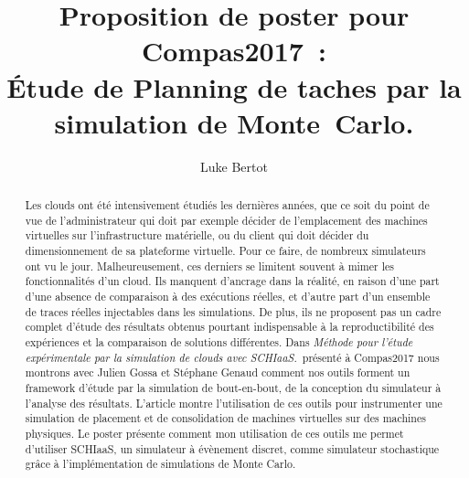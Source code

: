 \documentclass[parallelisme]{../compas2017}
\title{Proposition de poster pour Compas2017~:\\
Étude de Planning de taches par la simulation de Monte~Carlo.}
\author{Luke Bertot}
\begin{document}
\maketitle


%

\begin{abstract} Les clouds ont été intensivement étudiés les dernières années,
	que ce soit du point de vue de l'administrateur qui doit par exemple
	décider de l'emplacement des machines virtuelles sur l'infrastructure
	matérielle, ou du client qui doit décider du dimensionnement de sa
	plateforme virtuelle. Pour ce faire, de nombreux simulateurs ont vu le
	jour. Malheureusement, ces derniers se limitent souvent à mimer les
	fonctionnalités d'un cloud. Ils manquent d'ancrage dans la réalité, en
	raison d'une part d'une absence de comparaison à des exécutions réelles,
	et d'autre part d'un ensemble de traces réelles injectables dans les
	simulations. De plus, ils ne proposent pas un cadre complet d'étude des
	résultats obtenus pourtant indispensable à la reproductibilité des
	expériences et la comparaison de solutions différentes. Dans
	\emph{Méthode pour l’étude expérimentale par la simulation de clouds
	avec SCHIaaS.}\ présenté à Compas2017 nous montrons avec Julien Gossa et
	Stéphane Genaud comment nos outils forment un framework d'étude par la
	simulation de bout-en-bout, de la conception du simulateur à l'analyse
	des résultats. L'article montre l'utilisation de ces outils pour
	instrumenter une simulation de placement et de consolidation de machines
	virtuelles sur des machines physiques. Le poster présente comment mon
	utilisation de ces outils me permet d'utiliser SCHIaaS, un simulateur à
	évènement discret, comme simulateur stochastique grâce à 
	l'implémentation de simulations de Monte Carlo.
	
	 \end{abstract}
\end{document}
